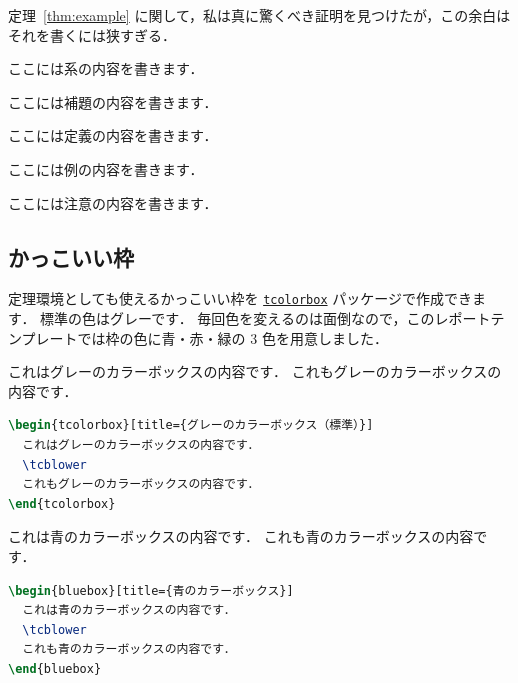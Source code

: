 \documentclass[
    paper=a4paper,      %
    article,            %
    fontsize=11pt,      %
    jafontsize=11pt,    %
    head_space=25mm,    %
    foot_space=25mm,    %
    gutter=20mm,        %
    fore-edge=20mm      %
    ]{jlreq}            %
\begin{document}
定理~\ref{thm:example} に関して，私は真に驚くべき証明を見つけたが，この余白はそれを書くには狭すぎる．

\begin{corollary}
ここには系の内容を書きます．
\end{corollary}

\begin{lemma}
ここには補題の内容を書きます．
\end{lemma}

\begin{definition}
ここには定義の内容を書きます．
\end{definition}

\begin{example}
ここには例の内容を書きます．
\end{example}

\begin{remark}
ここには注意の内容を書きます．
\end{remark}

\subsection{かっこいい枠}
\label{ssec:frame}

定理環境としても使えるかっこいい枠を \href{https://ctan.org/pkg/tcolorbox}{\texttt{tcolorbox}} パッケージで作成できます．
標準の色はグレーです．
毎回色を変えるのは面倒なので，このレポートテンプレートでは枠の色に青・赤・緑の 3 色を用意しました．

\begin{tcolorbox}[title={グレーのカラーボックス（標準）}]
  これはグレーのカラーボックスの内容です．
  \tcblower
  これもグレーのカラーボックスの内容です．
\end{tcolorbox}

\begin{lstlisting}[language=TeX]
\begin{tcolorbox}[title={グレーのカラーボックス（標準）}]
  これはグレーのカラーボックスの内容です．
  \tcblower
  これもグレーのカラーボックスの内容です．
\end{tcolorbox}
\end{lstlisting}

\begin{bluebox}[title={青のカラーボックス}]
  これは青のカラーボックスの内容です．
  \tcblower
  これも青のカラーボックスの内容です．
\end{bluebox}

\begin{lstlisting}[language=TeX]
\begin{bluebox}[title={青のカラーボックス}]
  これは青のカラーボックスの内容です．
  \tcblower
  これも青のカラーボックスの内容です．
\end{bluebox}
\end{lstlisting}
\end{document}
